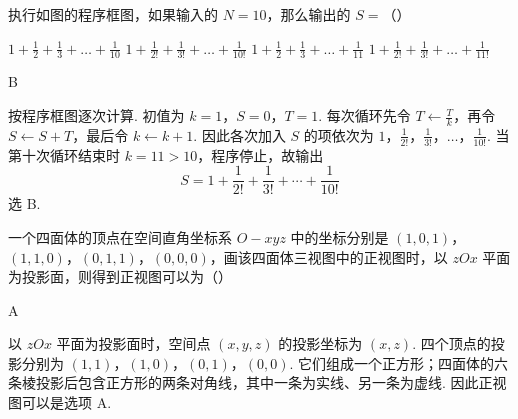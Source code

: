 \begin{problem}
执行如图的程序框图，如果输入的 \(N = 10\)，那么输出的 \(S =\)（\quad）

{\tallpagetrue
{}
}

\choices
    {\(1 + \frac{1}{2} + \frac{1}{3} + \dots + \frac{1}{10}\)}
    {\(1 + \frac{1}{2!} + \frac{1}{3!} + \dots + \frac{1}{10!}\)}
    {\(1 + \frac{1}{2} + \frac{1}{3} + \dots + \frac{1}{11}\)}
    {\(1 + \frac{1}{2!} + \frac{1}{3!} + \dots + \frac{1}{11!}\)}
\end{problem}

\begin{answer}
B
\end{answer}

\begin{solution}
按程序框图逐次计算. 初值为 \(k=1\)，\(S=0\)，\(T=1\). 每次循环先令 \(T\leftarrow \frac{T}{k}\)，再令 \(S\leftarrow S+T\)，最后令 \(k\leftarrow k+1\). 因此各次加入 \(S\) 的项依次为
\(1\)，\(\frac1{2!}\)，\(\frac1{3!}\)，\(\ldots\)，\(\frac1{10!}\).
当第十次循环结束时 \(k=11>10\)，程序停止，故输出
\[
S=1+\frac1{2!}+\frac1{3!}+\cdots+\frac1{10!}
\]
选 B.
\end{solution}

\begin{problem}
一个四面体的顶点在空间直角坐标系 \(O - xyz\) 中的坐标分别是 \((1, 0, 1)\)，\((1, 1, 0)\)，\((0, 1, 1)\)，\((0, 0, 0)\)，画该四面体三视图中的正视图时，以 \(zOx\) 平面为投影面，则得到正视图可以为（\quad）

    {}
    {}
    {}
\end{problem}

\begin{answer}
A
\end{answer}

\begin{solution}
以 \(zOx\) 平面为投影面时，空间点 \((x,y,z)\) 的投影坐标为 \((x,z)\). 四个顶点的投影分别为
\((1,1)\)，\((1,0)\)，\((0,1)\)，\((0,0)\).
它们组成一个正方形；四面体的六条棱投影后包含正方形的两条对角线，其中一条为实线、另一条为虚线. 因此正视图可以是选项 A.
\end{solution}

